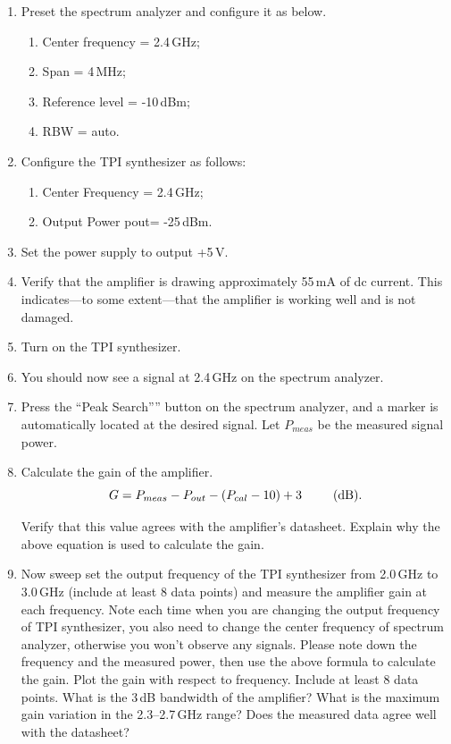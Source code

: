 \documentclass[letterpaper, 11pt]{article}
\begin{document}
\begin{enumerate}
	\item Preset the spectrum analyzer and configure it as below.
		\begin{enumerate}
			\item Center frequency = 2.4\,GHz; 
			\item Span = 4\,MHz;
			\item Reference level = -10\,dBm;
			\item RBW = auto.
		\end{enumerate}
	
	\item Configure the TPI synthesizer as follows:
		\begin{enumerate}
			\item Center Frequency = 2.4\,GHz;
			\item Output Power pout=  -25\,dBm.
		\end{enumerate}

	\item Set the power supply to output +5\,V. 

	\item Verify that the amplifier is drawing approximately 55\,mA of dc current. This indicates---to some extent---that the amplifier is working well and is not damaged. 
	
	\item Turn on the TPI synthesizer.
	
	\item You should now see a signal at 2.4\,GHz on the spectrum analyzer.

	\item Press the ``Peak Search”'' button on the spectrum analyzer, and a marker is automatically located at the desired signal. Let $P_{meas}$  be the measured signal power. 
	
	\item Calculate the gain of the amplifier. 
		\[
			G = P_{meas} - P_{out} - (P_{cal} - 10) + 3 \hspace{2.5em} \text{(dB).}
		\]
		
		Verify that this value agrees with the amplifier's datasheet. Explain why the above equation is used to calculate the gain. 
	
	\item Now sweep set the output frequency of the TPI synthesizer from 2.0\,GHz to 3.0\,GHz (include at least 8 data points) and measure the amplifier gain at each frequency. Note each time when you are changing the output frequency of TPI synthesizer, you also need to change the center frequency of spectrum analyzer, otherwise you won't observe any signals. Please note down the frequency and the measured power, then use the above formula to calculate the gain. Plot the gain with respect to frequency. Include at least 8 data points. What is the 3\,dB bandwidth of the amplifier? What is the maximum gain variation in the 2.3--2.7\,GHz range? Does the measured data agree well with the datasheet?
\end{enumerate}
\end{document}
